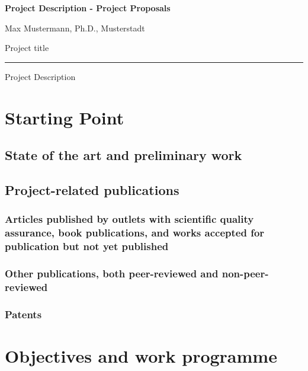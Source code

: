 \documentclass{scrartcl}
\newcommand{\applicants}{Max Mustermann, Ph.D., Musterstadt}
\newcommand{\project}{Project title}
\begin{document}
{\raggedright{} \normalsize \bfseries 
	Project Description - Project Proposals \par
	\applicants{} \par
	\project{} \par
	\rule{\textwidth}{0.5pt} \par
	Project Description
}


\section{Starting Point}

\subsection{State of the art and preliminary work}

\subsection{Project-related publications}

\subsubsection{Articles published by outlets with scientific quality assurance, book publications, and works accepted for publication but not yet published}
\printbibliography[category=reviewed, heading=none]

\subsubsection{Other publications, both peer-reviewed and non-peer-reviewed}
\printbibliography[category=nonreviewed, heading=none]

\subsubsection{Patents}

\printbibliography[category=patents_pending, heading=none]

\printbibliography[category=patents, heading=none]


\section{Objectives and work programme}
\end{document}
